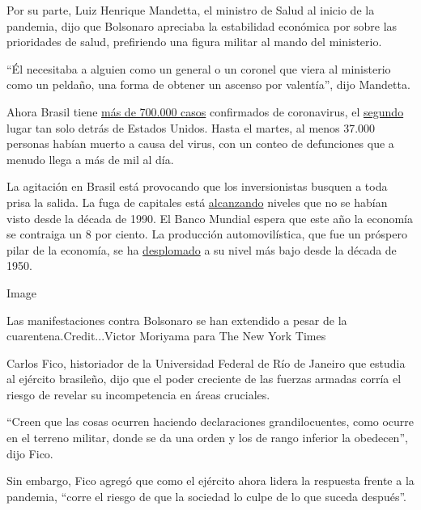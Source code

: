 Por su parte, Luiz Henrique Mandetta, el ministro de Salud al inicio de
la pandemia, dijo que Bolsonaro apreciaba la estabilidad económica por
sobre las prioridades de salud, prefiriendo una figura militar al mando
del ministerio.

``Él necesitaba a alguien como un general o un coronel que viera al
ministerio como un peldaño, una forma de obtener un ascenso por
valentía'', dijo Mandetta.

Ahora Brasil tiene
\href{https://www.nytimes3xbfgragh.onion/interactive/2020/world/coronavirus-maps.html}{más
de 700.000 casos} confirmados de coronavirus, el
\href{https://www.nytimes3xbfgragh.onion/interactive/2020/world/coronavirus-maps.html}{segundo}
lugar tan solo detrás de Estados Unidos. Hasta el martes, al menos
37.000 personas habían muerto a causa del virus, con un conteo de
defunciones que a menudo llega a más de mil al día.

La agitación en Brasil está provocando que los inversionistas busquen a
toda prisa la salida. La fuga de capitales está
\href{https://economia.uol.com.br/colunas/jose-paulo-kupfer/2020/05/27/fuga-de-capitais-se-acentua-e-alerta-para-falta-de-confianca-no-brasil.htm}{alcanzando}
niveles que no se habían visto desde la década de 1990. El Banco Mundial
espera que este año la economía se contraiga un 8 por ciento. La
producción automovilística, que fue un próspero pilar de la economía, se
ha
\href{https://www.terra.com.br/parceiros/guia-do-carro/industria-automobilistica-tem-o-pior-resultado-desde-1957,2607f811c62d5d3abc66af24c1cb08712gk0gjq1.html}{desplomado}
a su nivel más bajo desde la década de 1950.

Image

Las manifestaciones contra Bolsonaro se han extendido a pesar de la
cuarentena.Credit...Victor Moriyama para The New York Times

Carlos Fico, historiador de la Universidad Federal de Río de Janeiro que
estudia al ejército brasileño, dijo que el poder creciente de las
fuerzas armadas corría el riesgo de revelar su incompetencia en áreas
cruciales.

``Creen que las cosas ocurren haciendo declaraciones grandilocuentes,
como ocurre en el terreno militar, donde se da una orden y los de rango
inferior la obedecen'', dijo Fico.

Sin embargo, Fico agregó que como el ejército ahora lidera la respuesta
frente a la pandemia, ``corre el riesgo de que la sociedad lo culpe de
lo que suceda después''.

